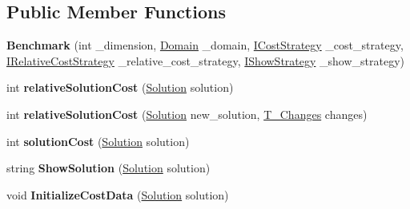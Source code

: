 \subsection*{Public Member Functions}
\begin{DoxyCompactItemize}
\item 
\mbox{\label{classPOSL_1_1Benchmarks_1_1Benchmark_ae548e466c0be888895a5009429932201}} 
{\bfseries Benchmark} (int \+\_\+dimension, \hyperlink{classPOSL_1_1Domain}{Domain} \+\_\+domain, \hyperlink{interfacePOSL_1_1Benchmarks_1_1ICostStrategy}{I\+Cost\+Strategy} \+\_\+cost\+\_\+strategy, \hyperlink{interfacePOSL_1_1Benchmarks_1_1IRelativeCostStrategy}{I\+Relative\+Cost\+Strategy} \+\_\+relative\+\_\+cost\+\_\+strategy, \hyperlink{interfacePOSL_1_1Benchmarks_1_1IShowStrategy}{I\+Show\+Strategy} \+\_\+show\+\_\+strategy)
\item 
\mbox{\label{classPOSL_1_1Benchmarks_1_1Benchmark_a3dfb4640f087374b57bd40337c8cc920}} 
int {\bfseries relative\+Solution\+Cost} (\hyperlink{classPOSL_1_1Data_1_1Solution}{Solution} solution)
\item 
\mbox{\label{classPOSL_1_1Benchmarks_1_1Benchmark_ab488f070e3fec663718efaea87e92084}} 
int {\bfseries relative\+Solution\+Cost} (\hyperlink{classPOSL_1_1Data_1_1Solution}{Solution} new\+\_\+solution, \hyperlink{structPOSL_1_1Tools_1_1T__Changes}{T\+\_\+\+Changes} changes)
\item 
\mbox{\label{classPOSL_1_1Benchmarks_1_1Benchmark_a4be37728713fb268d139bc0a1b98a654}} 
int {\bfseries solution\+Cost} (\hyperlink{classPOSL_1_1Data_1_1Solution}{Solution} solution)
\item 
\mbox{\label{classPOSL_1_1Benchmarks_1_1Benchmark_a2000f8bd97b5e5c39a5a4dfd9796336c}} 
string {\bfseries Show\+Solution} (\hyperlink{classPOSL_1_1Data_1_1Solution}{Solution} solution)
\item 
\mbox{\label{classPOSL_1_1Benchmarks_1_1Benchmark_a17f3f8597ab08be6a36bdc9216ec7cb4}} 
void {\bfseries Initialize\+Cost\+Data} (\hyperlink{classPOSL_1_1Data_1_1Solution}{Solution} solution)
\item 

\end{DoxyCompactItemize}
